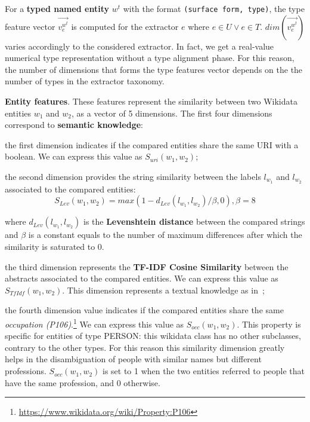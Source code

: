 \documentclass{llncs}
\begin{document}
For a \textbf{typed named entity} $w^t$ with the format \texttt{(surface form, type)}, the type feature vector $\vec{v^{w^t}_{e}}$ is computed for the extractor $e$ where $e \in U \lor e \in T$. $dim(\vec{v^{w^t}_{e}})$ varies accordingly to the considered extractor. In fact, we get a real-value numerical type representation without a type alignment phase. For this reason, the number of dimensions that forms the type features vector depends on the the number of types in the extractor taxonomy.

\textbf{Entity features}. These features represent the similarity between two Wikidata entities $w_1$ and $w_2$, as a vector of 5 dimensions. The first four dimensions correspond to \textbf{semantic knowledge}:
\begin{enumerate}
\begin{item}
the first dimension indicates if the compared entities share the same URI with a boolean. We can express this value as $S_{uri}(w_1,w_2)$; \end{item}
\begin{item}
the second dimension provides the string similarity between the labels $l_{w_1}$ and $l_{w_2}$ associated to the compared entities: 
$$S_{Lev}(w_1,w_2) = max(1-d_{Lev}(l_{w_1},l_{w_2})/\beta,0), \beta = 8$$

where $d_{Lev}(l_{w_1},l_{w_2})$ is the \textbf{Levenshtein distance} between the compared strings and $\beta$ is a constant equals to the number of maximum differences after which the similarity is saturated to 0.
\end{item}
\begin{item}
the third dimension represents the \textbf{TF-IDF Cosine Similarity} between the abstracts associated to the compared entities. We can express this value as $S_{TfIdf}(w_1,w_2)$. This dimension represents a textual knowledge as in~\cite{CollaborativeKnowledgeBaseEmbeddingforRecommenderSystems};
\end{item}
\begin{item}
the fourth dimension value indicates if the compared entities share the same \textit{occupation (P106)}.\footnote{\url{https://www.wikidata.org/wiki/Property:P106}} We can express this value as $S_{occ}(w_1,w_2)$. This property is specific for entities of type PERSON: this wikidata class has no other subclasses, contrary to the other types. For this reason this similarity dimension greatly helps in the disambiguation of people with similar names but different professions.  $S_{occ}(w_1,w_2)$ is set to 1 when the two entities referred to people that have the same profession, and 0 otherwise.
\end{item}
\end{enumerate}
\end{document}
